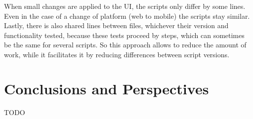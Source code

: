 \documentclass{chi-ext}
\begin{document}
When small changes are applied to the UI, the scripts only differ by some lines. Even in the case of a change of platform (web to mobile) the scripts stay similar.
Lastly, there is also shared lines between files, whichever their version and functionality tested, because these tests proceed by steps, which can sometimes be the same for several scripts.
So this approach allows to reduce the amount of work, while it facilitates it by reducing differences between script versions.

\section{Conclusions and Perspectives}
TODO

\balance


\end{document}

